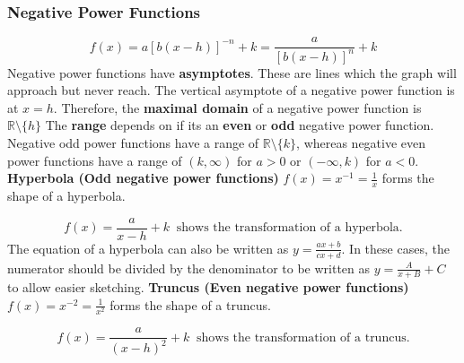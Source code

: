 \documentclass{article}
\begin{document}
			\subsubsection{Negative Power Functions}
				\[f(x)=a[b(x-h)]^{-n}+k=\frac{a}{[b(x-h)]^n}+k\]
				Negative power functions have \textbf{asymptotes}. These are lines which the graph will approach but never reach. \newline
				The vertical asymptote of a negative power function is at $x=h$. Therefore, the \textbf{maximal domain} of a negative power function is $\mathbb{R} \setminus \{h\}$\newline\newline
				The \textbf{range} depends on if its an \textbf{even} or \textbf{odd} negative power function. Negative odd power functions have a range of $\mathbb{R} \setminus \{k\}$, whereas negative even power functions have a range of $(k,\infty)$ for $a>0$ or $(-\infty,k)$ for $a<0$.\newline\newline
				\textbf{Hyperbola (Odd negative power functions)}\newline
				$f(x)=x^{-1}=\frac{1}{x}$ forms the shape of a hyperbola.
				\begin{center}
				\end{center}
				\[f(x)=\frac{a}{x-h}+k\;\;\textrm{shows the transformation of a hyperbola.}\]
				The equation of a hyperbola can also be written as $y=\frac{ax+b}{cx+d}$. In these cases, the numerator should be divided by the denominator to be written as $y=\frac{A}{x+B}+C$ to allow easier sketching.
				\newpage
				\noindent\textbf{Truncus (Even negative power functions)}\newline
				$f(x)=x^{-2}=\frac{1}{x^2}$ forms the shape of a truncus.
				\begin{center}
				\end{center}
				\[f(x)=\frac{a}{(x-h)^2}+k\;\;\textrm{shows the transformation of a truncus.}\]
				\newline
\end{document}
